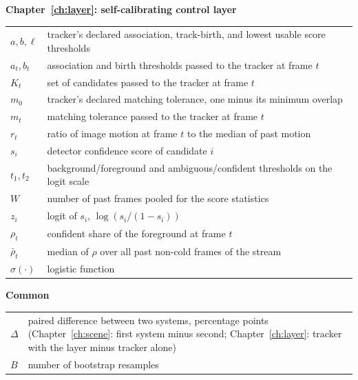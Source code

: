 \noindent\textbf{Chapter~\ref{ch:layer}: self-calibrating control layer}
\begin{longtable}{@{}p{3.2cm}>{\raggedright\arraybackslash}p{11cm}@{}}
$a, b, \ell$ & tracker's declared association, track-birth, and lowest usable score thresholds \\
$a_t, b_t$ & association and birth thresholds passed to the tracker at frame $t$ \\
$K_t$ & set of candidates passed to the tracker at frame $t$ \\
$m_0$ & tracker's declared matching tolerance, one minus its minimum overlap \\
$m_t$ & matching tolerance passed to the tracker at frame $t$ \\
$r_t$ & ratio of image motion at frame $t$ to the median of past motion \\
$s_i$ & detector confidence score of candidate $i$ \\
$t_1, t_2$ & background/foreground and ambiguous/confident thresholds on the logit scale \\
$W$ & number of past frames pooled for the score statistics \\
$z_i$ & logit of $s_i$, $\log\left(s_i/(1-s_i)\right)$ \\
$\rho_t$ & confident share of the foreground at frame $t$ \\
$\bar\rho_t$ & median of $\rho$ over all past non-cold frames of the stream \\
$\sigma(\cdot)$ & logistic function \\
\end{longtable}

\noindent\textbf{Common}
\begin{longtable}{@{}p{3.2cm}>{\raggedright\arraybackslash}p{11cm}@{}}
$\Delta$ & paired difference between two systems, percentage points (Chapter~\ref{ch:scene}: first system minus second; Chapter~\ref{ch:layer}: tracker with the layer minus tracker alone) \\
$B$ & number of bootstrap resamples \\
\end{longtable}

